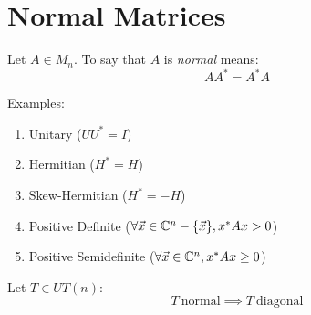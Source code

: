 \documentclass[letterpaper,12pt,fleqn]{article}
\newcommand{\vx}{\vec{x}}
\begin{document}
\section*{Normal Matrices}

\begin{definition}
  Let $A\in M_n$. To say that $A$ is \emph{normal} means:
  \[AA^*=A^*A\]
\end{definition}

Examples:
\begin{enumerate}
\item Unitary ($UU^*=I$)
\item Hermitian ($H^*=H$)
\item Skew-Hermitian ($H^*=-H$)
\item Positive Definite ($\forall\vx\in\C^n-\{\vx\},x^*Ax>0$)
\item Positive Semidefinite ($\forall\vx\in\C^n,x^*Ax\ge0$)
\end{enumerate}

\begin{lemma}
  Let $T\in UT(n)$:
  \[T\ \mbox{normal}\implies T\ \mbox{diagonal}\]
\end{lemma}
\end{document}
